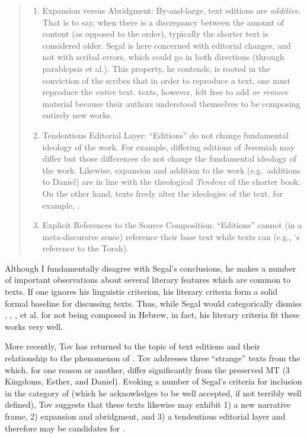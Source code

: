 \begin{quote}
\begin{enumerate}
    \item Expansion versus Abridgment: By-and-large, text editions are \emph{additive}. That is to say, when there is a discrepancy between the amount of content (as opposed to the order), typically the shorter text is considered older. Segal is here concerned with editorial changes, and not with scribal errors, which could go in both directions (through parablepsis et al.). This property, he contends, is rooted in the conviction of the scribes that in order to reproduce a text, one must reproduce the \emph{entire} text.%
        \autocite[24]{segal_henze2005}
    \rwb texts, however, felt free to add \emph{or remove} material because their authors understood themselves to be composing entirely new works.%
        \autocite[24]{segal_henze2005} 

    \item Tendentious Editorial Layer: ``Editions'' do not change fundamental ideology of the work. For example, differing editions of Jeremiah may differ but those differences do not change the fundamental ideology of the work. Likewise, expansion and addition to the work (e.g.~additions to Daniel) are in line with the theological \emph{Tendenz} of the shorter book. On the other hand, \rwb texts freely alter the ideologies of the text, for example, \jub.%
        \autocite[25]{segal_henze2005}

    \item Explicit References to the Source Composition: ``Editions'' cannot (in a meta-discursive sense) reference their base text while \rwb texts can (e.g., \jub's reference to the Torah).
\end{enumerate} 
\end{quote} 

Although I fundamentally disagree with Segal's conclusions, he makes a number of important observations about several literary features which are common to \rwb texts. If one ignores his linguistic criterion, his literary criteria form a solid formal baseline for discussing \rwb texts. Thus, while Segal would categorically dismiss \ga, \ant, \lab, et al. for not being composed in Hebrew, in fact, his literary criteria fit these works very well.

More recently, Tov has returned to the topic of text editions and their relationship to the phenomenon of \rwb.%
    \autocite{tov_krarrer-kraus2008}
Tov addresses three ``strange'' texts from the \lxx which, for one reason or another, differ significantly from the preserved MT (3 Kingdoms, Esther, and Daniel). Evoking a number of Segal's criteria for inclusion in the category of \rwb (which he acknowledges to be well accepted, if not terribly well defined), Tov suggests that these \lxx texts likewise may exhibit 1) a new narrative frame, 2) expansion and abridgment, and 3) a tendentious editorial layer and therefore may be candidates for \rwb. 

